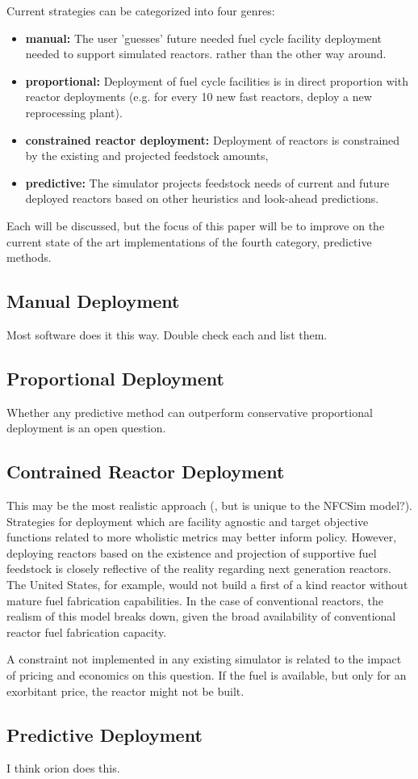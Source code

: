 Current strategies can be categorized into four genres: 

\begin{itemize}
        \item \textbf{manual:} The user 'guesses' future needed fuel cycle facility 
                deployment needed to support simulated reactors.
                rather than the other way around. 
        \item \textbf{proportional:} Deployment of fuel cycle facilities is in 
                direct proportion with reactor deployments (e.g. for every 10 
                new fast reactors, deploy a new reprocessing plant).
        \item \textbf{constrained reactor deployment:} Deployment of reactors is 
                constrained by the existing and projected feedstock amounts, 
        \item \textbf{predictive:} The simulator projects feedstock needs of 
                current and future deployed reactors based on other heuristics 
                and look-ahead predictions. 
\end{itemize}

Each will be discussed, but the focus of this paper will be to improve on the 
current state of the art implementations of the fourth category, predictive 
methods. 

\subsection{Manual Deployment}
Most software does it this way. Double check each and list them. 

\subsection{Proportional Deployment}

Whether any predictive method can outperform conservative proportional 
deployment is an open question. 

\subsection{Contrained Reactor Deployment}

This may be the most realistic approach (, but is unique to the NFCSim 
model?). Strategies for deployment which are facility agnostic and target 
objective functions related to more wholistic metrics may better inform policy. 
However, deploying reactors based on the existence and projection of supportive 
fuel feedstock is closely reflective of the reality regarding next generation 
reactors. The United States, for example, would not build a first of a kind 
reactor without mature fuel fabrication capabilities. In the case of 
conventional reactors, the realism of this model breaks down, given the broad 
availability of conventional reactor fuel fabrication capacity.  


A constraint not implemented in any existing simulator is related to the impact 
of pricing and economics on this question. If the fuel is available, but only 
for an exorbitant price, the reactor might not be built. 

\subsection{Predictive Deployment}
I think orion does this. 


